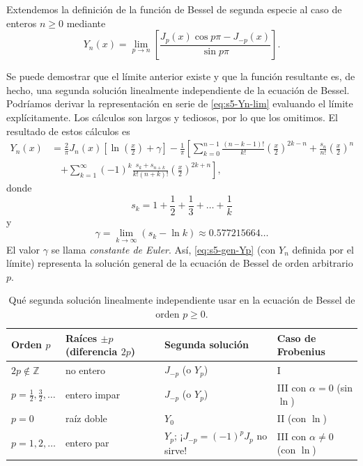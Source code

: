 \begin{definition}
Extendemos la definición de la función de Bessel de segunda especie al caso de enteros $n\ge0$ mediante
\begin{equation}
Y_n(x) = \lim_{p \to n} \left[ \frac{J_p(x) \cos p\pi - J_{-p}(x)}{\sin p\pi} \right].
\label{eq:s5-Yn-lim}
\end{equation}
\end{definition}
 
Se puede demostrar que el límite anterior existe y que la función resultante es, de hecho, una segunda solución linealmente independiente de la ecuación de Bessel. Podríamos derivar la representación en serie de \eqref{eq:s5-Yn-lim} evaluando el límite explícitamente. Los cálculos son largos y tediosos, por lo que los omitimos. El resultado de estos cálculos es
\begin{align*}
Y_n(x) &= \frac{2}{\pi} J_n(x) \left[ \ln \left( \frac{x}{2} \right) + \gamma \right] - \frac{1}{\pi} \left[ \sum_{k=0}^{n-1} \frac{(n - k - 1)!}{k!} \left( \frac{x}{2} \right)^{2k-n} + \frac{s_n}{n!} \left( \frac{x}{2} \right)^n \right. \\
&\quad \left. + \sum_{k=1}^{\infty} (-1)^k \frac{s_k + s_{n+k}}{k!(n + k)!} \left( \frac{x}{2} \right)^{2k+n} \right],
\end{align*}
donde
\[ s_k = 1 + \frac{1}{2} + \frac{1}{3} + \dots + \frac{1}{k} \]
y
\[ \gamma = \lim_{k \to \infty} (s_k - \ln k) \approx 0.577215664\dots \]
El valor $\gamma$ se llama \textit{constante de Euler}. Así, \eqref{eq:s5-gen-Yp} (con $Y_n$ definida por el límite) representa la solución general de la ecuación de Bessel de orden arbitrario $p$.
 
\begin{table}[H]
\centering
\small
\caption{Qué segunda solución linealmente independiente usar en la ecuación de Bessel de orden $p\ge0$.}
\label{tab:s5-segunda}
\begin{tabular}{|p{3.6cm}|p{3.8cm}|p{3.2cm}|p{3.4cm}|}
\hline
\rowcolor{bbe!15}\textbf{Orden $p$} & \textbf{Raíces $\pm p$ (diferencia $2p$)} & \textbf{Segunda solución} & \textbf{Caso de Frobenius} \\ \hline
$2p\notin\mathbb Z$ & no entero & $J_{-p}$ (o $Y_p$) & I \\ \hline
$p=\frac12,\frac32,\dots$ & entero impar & $J_{-p}$ (o $Y_p$) & III con $\alpha=0$ (sin $\ln$) \\ \hline
$p=0$ & raíz doble & $Y_0$ & II (con $\ln$) \\ \hline
$p=1,2,\dots$ & entero par & $Y_p$; ¡$J_{-p}=(-1)^pJ_p$ no sirve! & III con $\alpha\ne0$ (con $\ln$) \\ \hline
\end{tabular}
\end{table}
 
